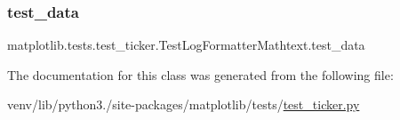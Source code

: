 \subsubsection{\texorpdfstring{test\+\_\+data}{test\_data}}
{\footnotesize\ttfamily matplotlib.\+tests.\+test\+\_\+ticker.\+Test\+Log\+Formatter\+Mathtext.\+test\+\_\+data\hspace{0.3cm}{\ttfamily [static]}}



The documentation for this class was generated from the following file\+:\begin{DoxyCompactItemize}
\item 
venv/lib/python3./site-\/packages/matplotlib/tests/\hyperlink{test__ticker_8py}{test\+\_\+ticker.\+py}\end{DoxyCompactItemize}
